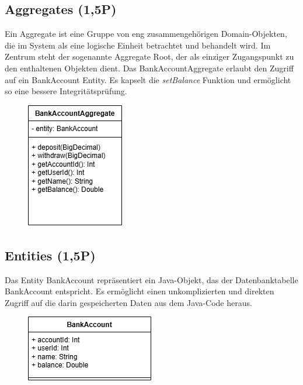 \subsection{Aggregates (1,5P)}
Ein Aggregate ist eine Gruppe von eng zusammengehörigen Domain-Objekten, die im System als eine logische Einheit betrachtet und behandelt wird. Im Zentrum steht der sogenannte Aggregate Root, der als einziger Zugangspunkt zu den enthaltenen Objekten dient. Das BankAccountAggregate erlaubt den Zugriff auf ein BankAccount Entity. Es kapselt die \textit{setBalance} Funktion und ermöglicht so eine bessere Integritätsprüfung.
\begin{figure}[htbp]
    \centering
\includegraphics{kapitel6_ddd/aggregate.drawio.png}
\end{figure}
\newpage
\subsection{Entities (1,5P)}
Das Entity BankAccount repräsentiert ein Java-Objekt, das der Datenbanktabelle BankAccount entspricht. Es ermöglicht einen unkomplizierten und direkten Zugriff auf die darin gespeicherten Daten aus dem Java-Code heraus.
\begin{figure}[htbp]
    \centering
\includegraphics{kapitel6_ddd/entity.png}
\end{figure}
\newpage
